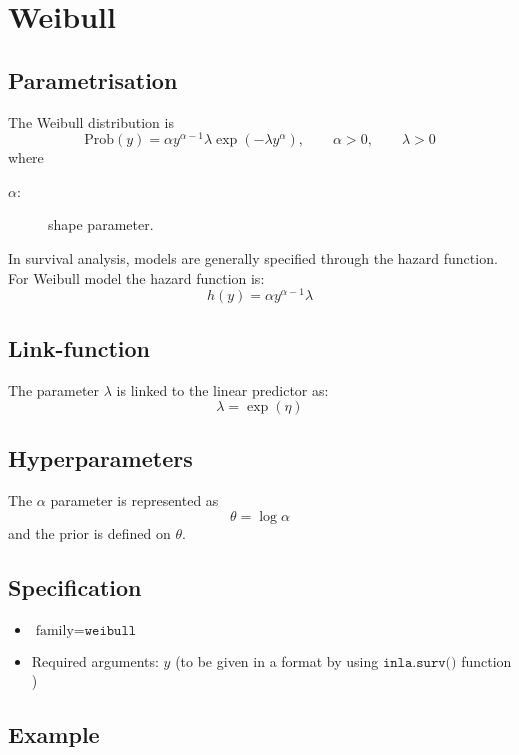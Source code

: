 \documentclass[a4paper,11pt]{article}
\begin{document}
\section*{Weibull}

\subsection*{Parametrisation}

The Weibull distribution is
\begin{displaymath}
    \text{Prob}(y) = \alpha y^{\alpha-1} \lambda\exp( - \lambda  y^{\alpha}), \qquad \alpha>0, \qquad \lambda>0
\end{displaymath}
where
\begin{description}
\item[$\alpha$:] shape parameter.
\end{description}
In survival analysis, models are generally specified through the
hazard function. For Weibull model the hazard function is:
\begin{displaymath}
    h(y)  = \alpha y^{\alpha-1} \lambda
\end{displaymath}

\subsection*{Link-function}

The parameter $\lambda$ is linked to the linear predictor as:
\[
\lambda = \exp(\eta)
\]
\subsection*{Hyperparameters}

The $\alpha$ parameter is represented as
\[
\theta = \log\alpha
\]
and the prior is defined on $\theta$.

\subsection*{Specification}

\begin{itemize}
\item $\text{family}=\texttt{weibull}$
\item Required arguments: $y$ (to be given in a format by using
    $\texttt{inla.surv()}$ function )
\end{itemize}

\subsection*{Example}
\end{document}
